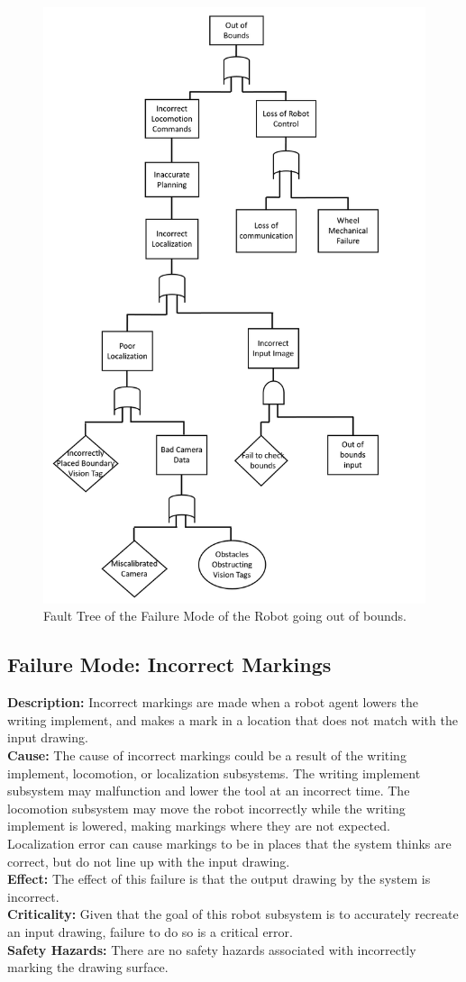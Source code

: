 \begin{figure}
 \centering
 \includegraphics[width=0.65\columnwidth]{figs/fault_table_bounds.png}
 \caption{Fault Tree of the Failure Mode of the Robot going out of bounds.}
 \label{fig:out_of_bounds_failure}
\end{figure}
\clearpage

\subsection{Failure Mode: Incorrect Markings}
\label{sec:sys_val_fm_markings}
\textbf{Description:} Incorrect markings are made when a robot agent lowers the writing implement, and makes a mark in a location that does not match with the input drawing. \\
\textbf{Cause:} The cause of incorrect markings could be a result of the writing implement, locomotion, or localization subsystems. The writing implement subsystem may malfunction and lower the tool at an incorrect time. The locomotion subsystem may move the robot incorrectly while the writing implement is lowered, making markings where they are not expected. Localization error can cause markings to be in places that the system thinks are correct, but do not line up with the input drawing.\\
\textbf{Effect:} The effect of this failure is that the output drawing by the system is incorrect.\\
\textbf{Criticality:} Given that the goal of this robot subsystem is to accurately recreate an input drawing, failure to do so is a critical error.\\
\textbf{Safety Hazards:} There are no safety hazards associated with incorrectly marking the drawing surface.\\

